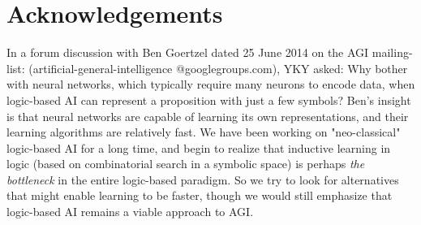 \documentclass{llncs}
\begin{document}
\section*{Acknowledgements}

\footnotesize{In a forum discussion with Ben Goertzel dated 25 June 2014 on the AGI mailing-list: (artificial-general-intelligence @googlegroups.com), YKY asked: Why bother with neural networks, which typically require many neurons to encode data, when logic-based AI can represent a proposition with just a few symbols?  Ben's insight is that neural networks are capable of learning its own representations, and their learning algorithms are relatively fast.  We have been working on "neo-classical" logic-based AI for a long time, and begin to realize that inductive learning in logic (based on combinatorial search in a symbolic space) is perhaps \textit{the bottleneck} in the entire logic-based paradigm.  So we try to look for alternatives that might enable learning to be faster, though we would still emphasize that logic-based AI remains a viable approach to AGI. %
}
\end{document}
